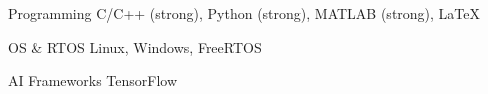 


\begin{cvskills}


\cvskill
{Programming} %
{C/C++ (strong), Python (strong), MATLAB (strong), LaTeX} %


\cvskill
{OS \& RTOS} %
{Linux, Windows, FreeRTOS} %


\begin{comment}
\cvskill
{Languages} %
{English, Chinese} %
\end{comment}


\cvskill
{AI Frameworks} %
{TensorFlow} %

\end{cvskills}